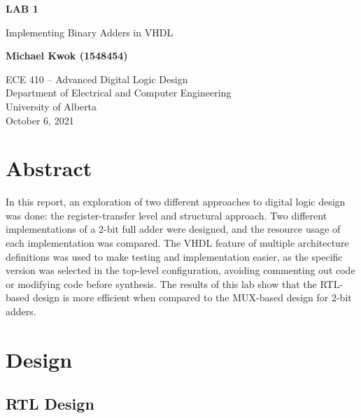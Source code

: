 \documentclass{article}
\begin{document}
\begin{titlepage}
    \begin{center}
        \vspace*{1cm}

        \textbf{\Large{LAB 1}}

        \vspace{0.5cm}

        \LARGE{Implementing Binary Adders in VHDL}

        \vspace{1.5cm}

        \textbf{\Large{Michael Kwok (1548454)}}

        \vfill

        ECE 410 -- Advanced Digital Logic Design\\
        Department of Electrical and Computer Engineering\\
        University of Alberta\\
        October 6, 2021

    \end{center}
\end{titlepage}

\tableofcontents
\listoffigures
\listoftables

\pagebreak

\section{Abstract}

In this report, an exploration of two different approaches to digital logic design was done: the register-transfer level and structural approach.
Two different implementations of a 2-bit full adder were designed, and the resource usage of each implementation was compared.
The VHDL feature of multiple architecture definitions was used to make testing and implementation easier,
as the specific version was selected in the top-level configuration,
avoiding commenting out code or modifying code before synthesis.
The results of this lab show that the RTL-based design is more efficient when compared to the MUX-based design for 2-bit adders.

\section{Design}

\subsection{RTL Design}
\end{document}
